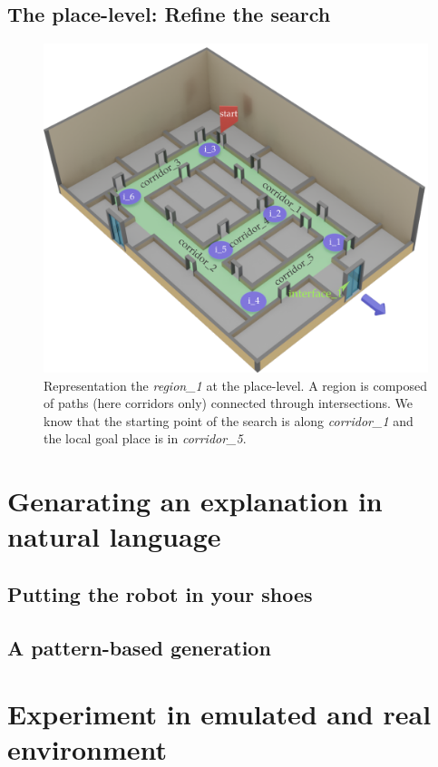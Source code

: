 \subsection{The place-level: Refine the search}

\begin{figure}[ht!]
\centering
\includegraphics[scale=0.28]{figures/chapter3/region1.png}
\caption{\label{fig:chap3_region1} Representation the \textit{region\_1} at the place-level. A region is composed of paths (here corridors only) connected through intersections. We know that the starting point of the search is along \textit{corridor\_1} and the local goal place is in \textit{corridor\_5}. }
\end{figure}

\section{Genarating an explanation in natural language}

\subsection{Putting the robot in your shoes}

\subsection{A pattern-based generation}

\section{Experiment in emulated and real environment}



